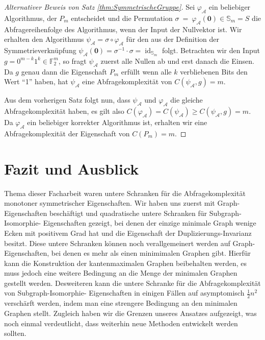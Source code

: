 \documentclass[10pt,a4paper, footheight=1mm]{scrreprt}
\theoremstyle{definition}
\begin{document}
\begin{proof}
[Alternativer Beweis von Satz \ref{thm:SymmetrischeGruppe}]
Sei $\varphi_\mathcal{A}$ ein beliebiger Algorithmus,
der $P_m$ entscheidet und die Permutation
$\sigma~=~\varphi_\mathcal{A}(\boldsymbol{0})\in\mathbb{S}_m=S$
die Abfragereihenfolge des Algorithmus, wenn der Input
der Nullvektor ist. Wir erhalten den Algorithmus
$\psi_\mathcal{A} = \sigma \circ \varphi_\mathcal{A}$
für den aus der Definition der Symmetrieverknüpfung
$\psi_\mathcal{A}(\boldsymbol{0})
= \sigma^{-1} \cdot \sigma = \operatorname{id}_{\mathbb{S}_m}$ folgt.
Betrachten wir den Input $g=0^{m-k}1^k \in \mathbb{F}_2^m$,
so fragt $\psi_\mathcal{A}$ zuerst alle Nullen ab und
erst danach die Einsen. Da $g$ genau dann die Eigenschaft
$P_m$ erfüllt wenn alle $k$ verbliebenen Bits den Wert
"`1"' haben, hat $\psi_\mathcal{A}$ eine Abfragekomplexität
von $C(\psi_\mathcal{A}, g) = m$.

Aus dem vorherigen Satz folgt nun, dass 
$\psi_\mathcal{A}$ und $\varphi_\mathcal{A}$ die gleiche
Abfragekomplexität haben, es gilt also
$C(\varphi_\mathcal{A}) = C(\psi_\mathcal{A}) 
\geq C(\psi_\mathcal{A},g) = m$.
Da $\varphi_\mathcal{A}$ ein beliebiger korrekter Algorithmus
ist, erhalten wir eine Abfragekomplexität der Eigenschaft
von $C(P_m)=m$.
\end{proof}


\begingroup
\let\clearpage\relax
\chapter{Fazit und Ausblick}
\endgroup
Thema dieser Facharbeit waren untere Schranken für die
Abfragekomplexität monotoner symmetrischer Eigenschaften.
Wir haben uns zuerst mit Graph-Eigenschaften beschäftigt 
und quadratische untere Schranken für Subgraph-Isomorphie-
Eigenschaften gezeigt, bei denen der einzige minimale
Graph wenige Ecken mit positivem Grad hat und die
Eigenschaft der Duplizierungs-Invarianz besitzt.
Diese untere Schranken können noch verallgemeinert werden
auf Graph-Eigenschaften, bei denen es mehr als einen
minimimalen Graphen gibt. Hierfür kann die Konstruktion
der kantenmaximalen Graphen beibehalten werden, es muss
jedoch eine weitere Bedingung an die Menge der minimalen
Graphen gestellt werden. Desweiteren kann die untere
Schranke für die Abfragekomplexität von Subgraph-Isomorphie-
Eigenschaften in einigen Fällen auf asymptomisch $\frac{1}{2}n^2$
verschärft werden, indem man eine strengere Bedingung
an den minimalen Graphen stellt.
Zugleich haben wir die Grenzen unseres Ansatzes
aufgezeigt, was noch einmal verdeutlicht, dass 
weiterhin neue Methoden entwickelt werden sollten.
\end{document}
